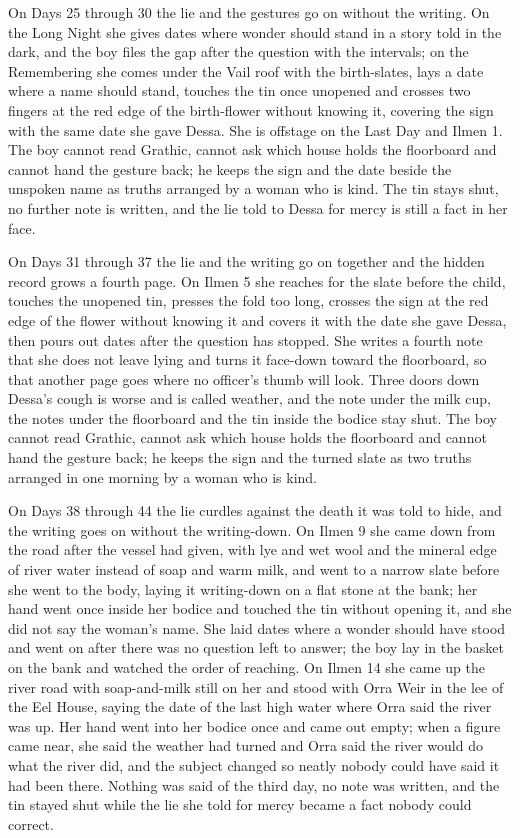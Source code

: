\documentclass{design/chronicle}
\begin{document}
{On Days 25 through 30 the lie and the gestures go on without the writing. On the Long Night she gives dates where wonder should stand in a story told in the dark, and the boy files the gap after the question with the intervals; on the Remembering she comes under the Vail roof with the birth-slates, lays a date where a name should stand, touches the tin once unopened and crosses two fingers at the red edge of the birth-flower without knowing it, covering the sign with the same date she gave Dessa. She is offstage on the Last Day and Ilmen 1. The boy cannot read Grathic, cannot ask which house holds the floorboard and cannot hand the gesture back; he keeps the sign and the date beside the unspoken name as truths arranged by a woman who is kind. The tin stays shut, no further note is written, and the lie told to Dessa for mercy is still a fact in her face.

On Days 31 through 37 the lie and the writing go on together and the hidden record grows a fourth page. On Ilmen 5 she reaches for the slate before the child, touches the unopened tin, presses the fold too long, crosses the sign at the red edge of the flower without knowing it and covers it with the date she gave Dessa, then pours out dates after the question has stopped. She writes a fourth note that she does not leave lying and turns it face-down toward the floorboard, so that another page goes where no officer’s thumb will look. Three doors down Dessa’s cough is worse and is called weather, and the note under the milk cup, the notes under the floorboard and the tin inside the bodice stay shut. The boy cannot read Grathic, cannot ask which house holds the floorboard and cannot hand the gesture back; he keeps the sign and the turned slate as two truths arranged in one morning by a woman who is kind.

On Days 38 through 44 the lie curdles against the death it was told to hide, and the writing goes on without the writing-down. On Ilmen 9 she came down from the road after the vessel had given, with lye and wet wool and the mineral edge of river water instead of soap and warm milk, and went to a narrow slate before she went to the body, laying it writing-down on a flat stone at the bank; her hand went once inside her bodice and touched the tin without opening it, and she did not say the woman’s name. She laid dates where a wonder should have stood and went on after there was no question left to answer; the boy lay in the basket on the bank and watched the order of reaching. On Ilmen 14 she came up the river road with soap-and-milk still on her and stood with Orra Weir in the lee of the Eel House, saying the date of the last high water where Orra said the river was up. Her hand went into her bodice once and came out empty; when a figure came near, she said the weather had turned and Orra said the river would do what the river did, and the subject changed so neatly nobody could have said it had been there. Nothing was said of the third day, no note was written, and the tin stayed shut while the lie she told for mercy became a fact nobody could correct.

}
\end{document}
